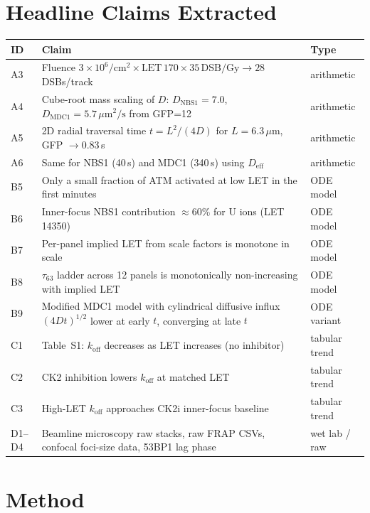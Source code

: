 \documentclass[11pt]{article}
\begin{document}
\section{Headline Claims Extracted}

\begin{longtable}{p{2.5cm}p{9cm}p{3cm}}
\toprule
\textbf{ID} & \textbf{Claim} & \textbf{Type} \\
\midrule
\endhead
A3 & Fluence $3\times10^6/\mathrm{cm}^2 \times \mathrm{LET}\,170 \times 35\,\mathrm{DSB/Gy} \rightarrow 28$ DSBs/track & arithmetic \\
A4 & Cube-root mass scaling of $D$: $D_\mathrm{NBS1}\!=\!7.0$, $D_\mathrm{MDC1}\!=\!5.7\,\mu\mathrm{m}^2/\mathrm{s}$ from GFP=12 & arithmetic \\
A5 & 2D radial traversal time $t=L^2/(4D)$ for $L=6.3\,\mu$m, GFP $\rightarrow 0.83$\,s & arithmetic \\
A6 & Same for NBS1 (40\,s) and MDC1 (340\,s) using $D_\mathrm{eff}$ & arithmetic \\
B5 & Only a small fraction of ATM activated at low LET in the first minutes & ODE model \\
B6 & Inner-focus NBS1 contribution $\approx 60\%$ for U ions (LET 14350) & ODE model \\
B7 & Per-panel implied LET from scale factors is monotone in scale & ODE model \\
B8 & $\tau_{63}$ ladder across 12 panels is monotonically non-increasing with implied LET & ODE model \\
B9 & Modified MDC1 model with cylindrical diffusive influx $(4Dt)^{1/2}$ lower at early $t$, converging at late $t$ & ODE variant \\
C1 & Table~S1: $k_\mathrm{off}$ decreases as LET increases (no inhibitor) & tabular trend \\
C2 & CK2 inhibition lowers $k_\mathrm{off}$ at matched LET & tabular trend \\
C3 & High-LET $k_\mathrm{off}$ approaches CK2i inner-focus baseline & tabular trend \\
D1--D4 & Beamline microscopy raw stacks, raw FRAP CSVs, confocal foci-size data, 53BP1 lag phase & wet lab / raw \\
\bottomrule
\end{longtable}

\section{Method}
\end{document}
